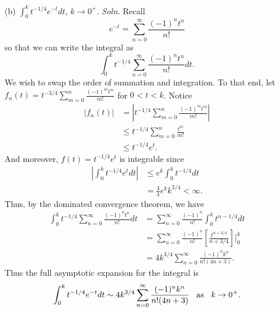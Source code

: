 \documentclass{article}
\begin{document}
\begin{itemize}
\begin{itemize}
        \item[(b)] ${\displaystyle \int_0^k t^{-1/4}e^{-t}dt}$, $k \to 0^+$.
        \newline\newline
        \textit{Soln.} Recall
        \[e^{-t} = \sum_{n = 0}^{\infty} \frac{(-1)^nt^n}{n!}\]
        so that we can write the integral as 
        \[\int_0^k t^{-1/4}\sum_{n = 0}^{\infty} \frac{(-1)^nt^n}{n!}dt.\]
        We wish to swap the order of summation and integration. To that end, let ${ \displaystyle f_n(t) = t^{-3/4}\sum_{m = 0}^{n}\frac{(-1)^mt^m}{m!} }$ for $0 < t < k$. Notice 
        \begin{align*}
            |f_n(t)| &= \left|t^{-1/4}\sum_{m = 0}^{n}\frac{(-1)^mt^m}{m!}\right|\\
            &\leq t^{-1/4}\sum_{m = 0}^{n}\frac{t^m}{m!}\\
            &\leq t^{-1/4}e^t.
        \end{align*}
        And moreover, $f(t) = t^{-1/4}e^t$ is integrable since
        \begin{align*}
            \left|\int_0^kt^{-1/4}e^tdt\right| &\leq e^k\int_0^kt^{-1/4}dt\\
            &= \frac{4}{3}e^kk^{3/4} < \infty.
        \end{align*}
        Thus, by the dominated convergence theorem, we have
        \begin{align*}
            \int_0^kt^{-1/4}\sum_{n = 0}^{\infty}\frac{(-1)^nt^n}{n!}dt &= \sum_{n = 0}^{\infty} \frac{(-1)^n}{n!}\int_0^k t^{n - 1/4}dt\\
            &= \sum_{n = 0}^{\infty}\frac{(-1)^n}{n!}\left[\frac{t^{n + 3/4}}{n + 3/4}\right]\bigg|_0^k\\
            &= 4k^{3/4}\sum_{n = 0}^{\infty}\frac{(-1)^nk^{n}}{n!(4n + 3)}.
        \end{align*}
        Thus the full asymptotic expansion for the integral is
        \[\int_0^k t^{-1/4}e^{-t}dt \sim 4k^{3/4}\sum_{n = 0}^{\infty} \frac{(-1)^nk^n}{n!(4n+3)} \hspace{0.3cm} \text{as} \hspace{0.3cm} k \to 0^+.\]



\end{itemize}
\end{itemize}
\end{document}
